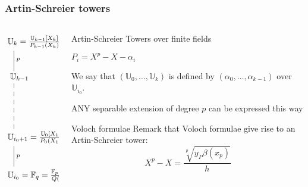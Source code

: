 \documentclass[10pt]{beamer}
\newcommand{\U}{\mathbb{U}}  %
\newcommand{\F}{\mathbb{F}}  %
\newcommand{\0}{\mathcal{O}}  %
\begin{document}

\begin{frame}
  \frametitle{Artin-Schreier towers}

  \begin{columns}
    \begin{column}{0.3\textwidth}
      \Large\[\xymatrix{
        *+[r]{\U_k = \frac{\U_{k-1}[X_k]}{P_{k-1}(X_k)}}\ar@{-}[d]^p\\
        *+[r]{\U_{k-1}} \ar@{--}[dd]\\
        \\
        *+[r]{\U_{i_0+1} = \frac{\U_0[X_1]}{P_0(X_1)}} \ar@{-}[d]^p\\
        *+[r]{\U_{i_0} = \F_q = \frac{\F_p[X_0]}{Q(X_0)}}
      }\]
    \end{column}
    \begin{column}{0.65\textwidth}
      \begin{block}{Artin-Schreier Towers over finite fields}
        \smallskip
        \begin{center}
          \Large$P_i = X^p - X - \alpha_i$
        \end{center}

        \begin{center}
          We say that $(\U_0,\ldots,\U_k)$ is defined by
          $(\alpha_0,\ldots,\alpha_{k-1})$ over $\U_{i_0}$.
        \end{center}
        \begin{center}
          \alert{ANY} separable extension of degree $p$ can be
          expressed this way
        \end{center}
      \end{block}

      \begin{block}{Voloch formulae}
        Remark that Voloch formulae give rise to an Artin-Schreier
        tower:
        \[X^p - X = \frac{\sqrt[p]{y_P\beta(x_p)}}{h}\]
      \end{block}
    \end{column}
  \end{columns}
\end{frame}

\end{document}
